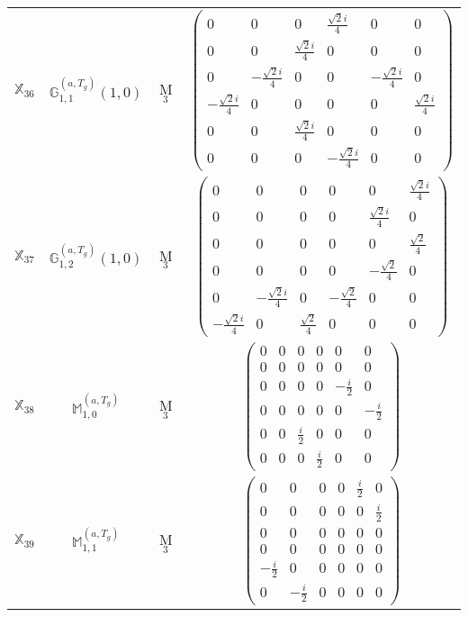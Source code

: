 \documentclass[fleqn,10pt,landscape]{article}
\begin{document}
\begin{itemize}
\begin{center}
\begin{longtable}{c|c|c|c}
$ \mathbb{X}_{36} $ & $\mathbb{G}_{1,1}^{(a,T_{g})}(1,0)$ & M$_{3}$ & $\begin{pmatrix} 0 & 0 & 0 & \frac{\sqrt{2} i}{4} & 0 & 0 \\ 0 & 0 & \frac{\sqrt{2} i}{4} & 0 & 0 & 0 \\ 0 & - \frac{\sqrt{2} i}{4} & 0 & 0 & - \frac{\sqrt{2} i}{4} & 0 \\ - \frac{\sqrt{2} i}{4} & 0 & 0 & 0 & 0 & \frac{\sqrt{2} i}{4} \\ 0 & 0 & \frac{\sqrt{2} i}{4} & 0 & 0 & 0 \\ 0 & 0 & 0 & - \frac{\sqrt{2} i}{4} & 0 & 0 \end{pmatrix}$ \\
$ \mathbb{X}_{37} $ & $\mathbb{G}_{1,2}^{(a,T_{g})}(1,0)$ & M$_{3}$ & $\begin{pmatrix} 0 & 0 & 0 & 0 & 0 & \frac{\sqrt{2} i}{4} \\ 0 & 0 & 0 & 0 & \frac{\sqrt{2} i}{4} & 0 \\ 0 & 0 & 0 & 0 & 0 & \frac{\sqrt{2}}{4} \\ 0 & 0 & 0 & 0 & - \frac{\sqrt{2}}{4} & 0 \\ 0 & - \frac{\sqrt{2} i}{4} & 0 & - \frac{\sqrt{2}}{4} & 0 & 0 \\ - \frac{\sqrt{2} i}{4} & 0 & \frac{\sqrt{2}}{4} & 0 & 0 & 0 \end{pmatrix}$ \\
$ \mathbb{X}_{38} $ & $\mathbb{M}_{1,0}^{(a,T_{g})}$ & M$_{3}$ & $\begin{pmatrix} 0 & 0 & 0 & 0 & 0 & 0 \\ 0 & 0 & 0 & 0 & 0 & 0 \\ 0 & 0 & 0 & 0 & - \frac{i}{2} & 0 \\ 0 & 0 & 0 & 0 & 0 & - \frac{i}{2} \\ 0 & 0 & \frac{i}{2} & 0 & 0 & 0 \\ 0 & 0 & 0 & \frac{i}{2} & 0 & 0 \end{pmatrix}$ \\
$ \mathbb{X}_{39} $ & $\mathbb{M}_{1,1}^{(a,T_{g})}$ & M$_{3}$ & $\begin{pmatrix} 0 & 0 & 0 & 0 & \frac{i}{2} & 0 \\ 0 & 0 & 0 & 0 & 0 & \frac{i}{2} \\ 0 & 0 & 0 & 0 & 0 & 0 \\ 0 & 0 & 0 & 0 & 0 & 0 \\ - \frac{i}{2} & 0 & 0 & 0 & 0 & 0 \\ 0 & - \frac{i}{2} & 0 & 0 & 0 & 0 \end{pmatrix}$ \\

\end{longtable}
\end{center}
\end{itemize}
\end{document}
